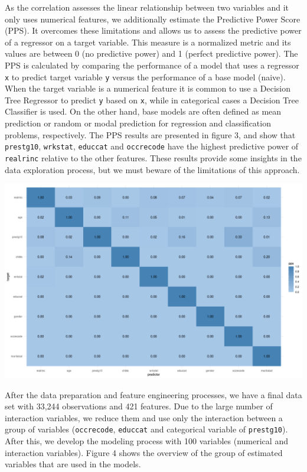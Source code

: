 \documentclass[11pt,a4paper]{article}
\let\origfigure\figure
\let\endorigfigure\endfigure
\renewenvironment{figure}[1][2] {
    \expandafter\origfigure\expandafter[H]
} {
    \endorigfigure
}
\begin{document}
As the correlation assesses the linear relationship between two
variables and it only uses numerical features, we additionally estimate
the Predictive Power Score (PPS). It overcomes these limitations and
allows us to assess the predictive power of a regressor on a target
variable. This measure is a normalized metric and its values are between
0 (no predictive power) and 1 (perfect predictive power). The PPS is
calculated by comparing the performance of a model that uses a regressor
\texttt{x} to predict target variable \texttt{y} versus the performance
of a base model (naive). When the target variable is a numerical feature
it is common to use a Decision Tree Regressor to predict \texttt{y}
based on \texttt{x}, while in categorical cases a Decision Tree
Classifier is used. On the other hand, base models are often defined as
mean prediction or random or modal prediction for regression and
classification problems, respectively. The PPS results are presented in
figure 3, and show that \texttt{prestg10}, \texttt{wrkstat},
\texttt{educcat} and \texttt{occrecode} have the highest predictive
power of \texttt{realrinc} relative to the other features. These results
provide some insights in the data exploration process, but we must
beware of the limitations of this approach.

\begin{figure}
\centering
\includegraphics{includes/pps.png}
\caption{PPS Results}
\end{figure}

After the data preparation and feature engineering processes, we have a
final data set with 33,244 observations and 421 features. Due to the
large number of interaction variables, we reduce them and use only the
interaction between a group of variables (\texttt{occrecode},
\texttt{educcat} and categorical variable of \texttt{prestg10}). After
this, we develop the modeling process with 100 variables (numerical and
interaction variables). Figure 4 shows the overview of the group of
estimated variables that are used in the models.
\end{document}
